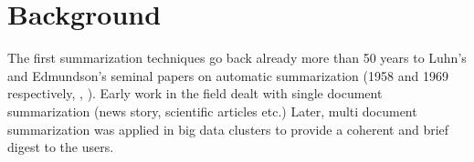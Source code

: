 \documentclass{article}
\begin{document}
\section{Background}
The first summarization techniques go back already more than 50 years to Luhn’s and Edmundson’s seminal papers on automatic summarization (1958 and 1969 respectively, \cite{textmining1958}, \cite{automaticextracting}). Early work in the field dealt with single document summarization (news story, scientific articles etc.) Later, multi document summarization was applied in big data clusters to provide a coherent and brief digest to the users. \\



\end{document}

